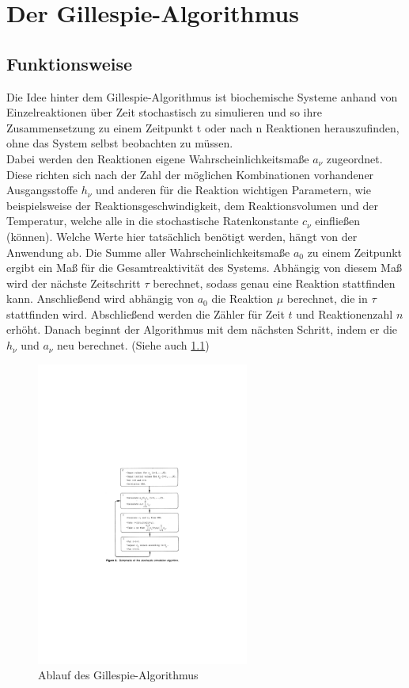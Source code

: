 \chapter{Der Gillespie-Algorithmus}
\section{Funktionsweise}
Die Idee hinter dem Gillespie-Algorithmus ist biochemische Systeme anhand von Einzelreaktionen über Zeit stochastisch zu simulieren und so ihre Zusammensetzung zu einem Zeitpunkt t oder nach n Reaktionen herauszufinden, ohne das System selbst beobachten zu müssen.\\
Dabei werden den Reaktionen eigene Wahrscheinlichkeitsmaße $a_{\nu}$ zugeordnet. Diese richten sich nach der Zahl der möglichen Kombinationen vorhandener Ausgangsstoffe $h_{\nu}$ und anderen für die Reaktion wichtigen Parametern, wie beispielsweise der Reaktionsgeschwindigkeit, dem Reaktionsvolumen und der Temperatur, welche alle in die stochastische Ratenkonstante $c_{\nu}$ einfließen (können). Welche Werte hier tatsächlich benötigt werden, hängt von der Anwendung ab. Die Summe aller Wahrscheinlichkeitsmaße $a_{0}$ zu einem Zeitpunkt ergibt ein Maß für die Gesamtreaktivität des Systems. Abhängig von diesem Maß wird der nächste Zeitschritt $\tau$ berechnet, sodass genau eine Reaktion stattfinden kann. Anschließend wird abhängig von $a_{0}$ die Reaktion $\mu$ berechnet, die in $\tau$ stattfinden wird. Abschließend werden die Zähler für Zeit $t$ und Reaktionenzahl $n$ erhöht. Danach beginnt der Algorithmus mit dem nächsten Schritt, indem er die $h_{\nu}$ und $a_{\nu}$ neu berechnet. (Siehe auch \ref{fig:Gillespie-Algorithmus})

\begin{figure}[h]
	\centering
	\includegraphics[height=10cm]{Bilder/Gillespie_workflow}
	\caption[justification=raggedright]{Ablauf des Gillespie-Algorithmus\cite{Gillespie1977}\label{fig:Gillespie-Algorithmus}}
\end{figure}


